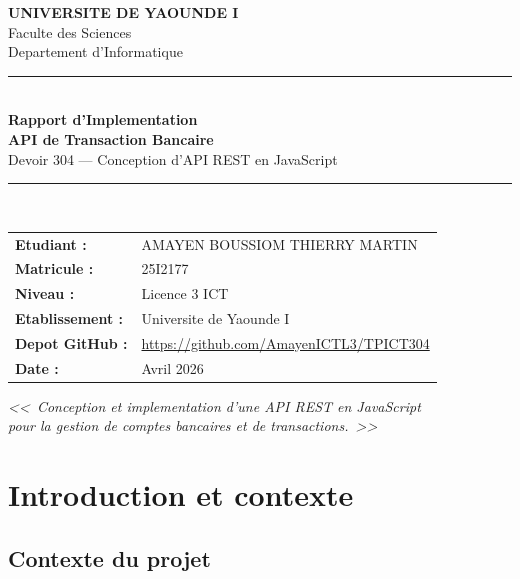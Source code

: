 \documentclass[12pt,a4paper]{article}
\begin{document}

\begin{titlepage}
\centering
\vspace*{1cm}
{\Large\bfseries UNIVERSITE DE YAOUNDE I\\[0.3cm]}
{\large Faculte des Sciences\\[0.1cm]}
{\large Departement d'Informatique\\[2cm]}

\noindent\rule{\linewidth}{2pt}\\[0.5cm]
{\Huge\bfseries\color{primary} Rapport d'Implementation}\\[0.3cm]
{\LARGE\bfseries API de Transaction Bancaire}\\[0.3cm]
{\large Devoir 304 --- Conception d'API REST en JavaScript}\\[0.3cm]
\noindent\rule{\linewidth}{2pt}\\[2cm]

\begin{tabular}{ll}
\textbf{Etudiant :} & AMAYEN BOUSSIOM THIERRY MARTIN \\[0.3cm]
\textbf{Matricule :} & 25I2177 \\[0.3cm]
\textbf{Niveau :} & Licence 3 ICT \\[0.3cm]
\textbf{Etablissement :} & Universite de Yaounde I \\[0.3cm]
\textbf{Depot GitHub :} & \url{https://github.com/AmayenICTL3/TPICT304} \\[0.3cm]
\textbf{Date :} & Avril 2026 \\
\end{tabular}

\vfill
{\large\textit{<<~Conception et implementation d'une API REST en JavaScript\\
pour la gestion de comptes bancaires et de transactions.~>>}}
\end{titlepage}

\tableofcontents
\newpage

\section{Introduction et contexte}

\subsection{Contexte du projet}
\end{document}
